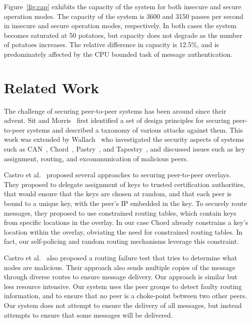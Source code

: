 \documentclass[11pt]{article}
\begin{document}
Figure~\ref{fig:cap} exhibits the capacity of the system for both
insecure and secure operation modes.  The capacity of the system
is 3600 and 3150 passes per second in insecure and secure operation
modes, respectively.  In both cases the system becomes saturated
at 50 potatoes, but capacity does not degrade as the number of
potatoes increases.  The relative difference in capacity is 12.5\%, 
and is predominately affected by the CPU bounded task of message 
authentication.


\section{Related Work}\label{sec:related}
The challenge of securing peer-to-peer systems has been around since
their advent.  Sit and Morris~\cite{SiMo02} first identified a set
of design principles for securing peer-to-peer systems and described
a taxonomy of various attacks against them.  This work was extended
by Wallach~\cite{Wa02} who investigated the security aspects of
systems such as CAN~\cite{RaFrHaKaSh01}, Chord~\cite{StMoKaKaBa01},
Pastry~\cite{RoDr01}, and Tapestry~\cite{ZhKuJo01}, and discussed 
issues such as key assignment, routing, and excommunication of 
malicious peers.

Castro et al.~\cite{CaDrGaRoWa02} proposed several approaches to
securing peer-to-peer overlays.  They proposed to delegate assignment
of keys to trusted certification authorities, that would ensure
that the keys are chosen at random, and that each peer is bound to
a unique key, with the peer's IP embedded in the key.  To securely
route messages, they proposed to use constrained routing tables,
which contain keys from specific locations in the overlay.  In our
case Chord already constrains a key's location within the overlay, 
obviating the need for constrained routing tables.  In fact, our 
self-policing and random routing mechanisms leverage this constraint.

Castro et al.~\cite{CaDrGaRoWa02} also proposed a routing failure
test that tries to determine what nodes are malicious.  Their
approach also sends multiple copies of the message through diverse
routes to ensure message delivery.  Our approach is similar but
less resource intensive.  Our system uses the peer groups to detect
faulty routing information, and to ensure that no peer is a choke-point
between two other peers.  Our system does not attempt to ensure the
delivery of all messages, but instead attempts to ensure that some
messages will be delivered.
\end{document}
